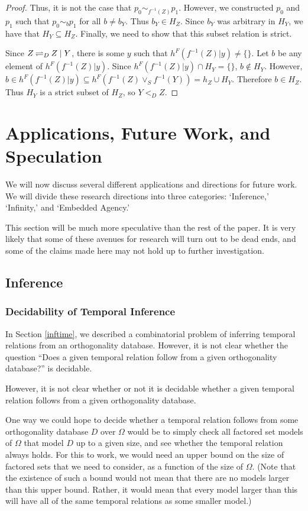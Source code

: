 \documentclass[authordate,onecolumn]{miri-tech-article}
\begin{document}
\begin{proof}
Thus, it is not the case that $p_0\sim_{f^{-1}(Z)} p_1$. However, we constructed $p_0$ and $p_1$ such that $p_0\sim_b p_1$ for all $b\neq b_Y$. Thus $b_Y\in H_Z$. Since $b_Y$ was arbitrary in $H_Y$, we have that  $H_Y\subseteq H_Z$. Finally, we need to show that this subset relation is strict. 

Since $Z\mathbin{\rightleftharpoons_{D}}Z\mid Y$, there is some $y$ such that $h^F(f^{-1}(Z)|y)\neq\{\}$. Let $b$ be any element of $h^F(f^{-1}(Z)|y)$. Since $h^F(f^{-1}(Z)|y)\cap H_Y=\{\}$, $b\notin H_Y$. However, $b\in h^F(f^{-1}(Z)|y)\subseteq h^F(f^{-1}(Z)\vee_S f^{-1}(Y))=h_Z\cup H_Y$. Therefore $b\in H_Z$. Thus $H_Y$ is a strict subset of $H_Z$, so $Y<_D Z$.
\end{proof}
\section{Applications, Future Work, and Speculation}
We will now discuss several different applications and directions for future work. We will divide these research directions into three categories: `Inference,' `Infinity,' and `Embedded Agency.'

This section will be much more speculative than the rest of the paper. It is very likely that some of these avenues for research will turn out to be dead ends, and some of the claims made here may not hold up to further investigation.
\subsection{Inference}
\subsubsection{Decidability of Temporal Inference}

In Section \ref{inftime}, we described a combinatorial problem of inferring temporal relations from an orthogonality database. However, it is not clear whether the question ``Does a given temporal relation follow from a given orthogonality database?'' is decidable.

However, it is not clear whether or not it is decidable whether a given temporal relation follows from a given orthogonality database. 

One way we could hope to decide whether a temporal relation follows from some orthogonality database $D$ over $\Omega$ would be to simply check all factored set models of $\Omega$ that model $D$ up to a given size, and see whether the temporal relation always holds. For this to work, we would need an upper bound on the size of factored sets that we need to consider, as a function of the size of $\Omega$. (Note that the existence of such a bound would not mean that there are no models larger than this upper bound. Rather, it would mean that every model larger than this will have all of the same temporal relations as some smaller model.)
\end{document}
